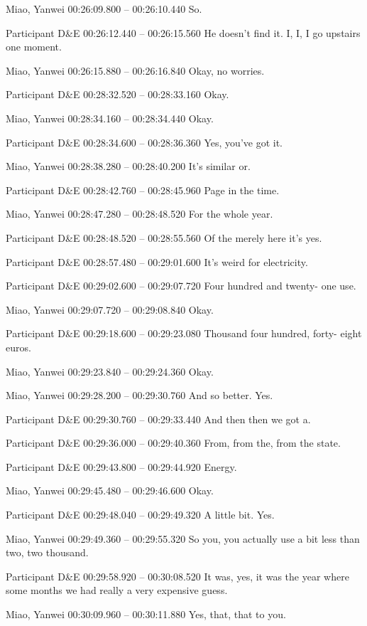 {Miao, Yanwei 00:26:09.800 -- 00:26:10.440
So.

Participant D\&E 00:26:12.440 -- 00:26:15.560
He doesn't find it. I, I, I go upstairs one moment.

Miao, Yanwei 00:26:15.880 -- 00:26:16.840
Okay, no worries.

Participant D\&E 00:28:32.520 -- 00:28:33.160
Okay.

Miao, Yanwei 00:28:34.160 -- 00:28:34.440
Okay.

Participant D\&E 00:28:34.600 -- 00:28:36.360
Yes, you've got it.

Miao, Yanwei 00:28:38.280 -- 00:28:40.200
It's similar or.

Participant D\&E 00:28:42.760 -- 00:28:45.960
Page in the time.

Miao, Yanwei 00:28:47.280 -- 00:28:48.520
For the whole year.

Participant D\&E 00:28:48.520 -- 00:28:55.560
Of the merely here it's yes.

Participant D\&E 00:28:57.480 -- 00:29:01.600
It's weird for electricity.

Participant D\&E 00:29:02.600 -- 00:29:07.720
Four hundred and twenty- one use.

Miao, Yanwei 00:29:07.720 -- 00:29:08.840
Okay.

Participant D\&E 00:29:18.600 -- 00:29:23.080
Thousand four hundred, forty- eight euros.

Miao, Yanwei 00:29:23.840 -- 00:29:24.360
Okay.

Miao, Yanwei 00:29:28.200 -- 00:29:30.760
And so better. Yes.

Participant D\&E 00:29:30.760 -- 00:29:33.440
And then then we got a.

Participant D\&E 00:29:36.000 -- 00:29:40.360
From, from the, from the state.

Participant D\&E 00:29:43.800 -- 00:29:44.920
Energy.

Miao, Yanwei 00:29:45.480 -- 00:29:46.600
Okay.

Participant D\&E 00:29:48.040 -- 00:29:49.320
A little bit. Yes.

Miao, Yanwei 00:29:49.360 -- 00:29:55.320
So you, you actually use a bit less than two, two thousand.

Participant D\&E 00:29:58.920 -- 00:30:08.520
It was, yes, it was the year where some months we had really a very expensive guess.

Miao, Yanwei 00:30:09.960 -- 00:30:11.880
Yes, that, that to you.

}
